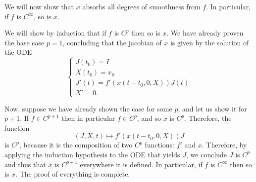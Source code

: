 \documentclass{article}
\begin{document}
We will now show that $x$ absorbs all degrees of smoothness from $f$. In particular, if $f$ is $C^\infty$, so is $x$.

We will show by induction that if $f$ is $C^p$ then so is $x$. We have already proven the base case $p = 1$, concluding that the jacobian of $x$ is given by the solution of the ODE
\[
\begin{cases}
J(t_0) = I\\
X(t_0) = x_0\\
J'(t) = f'(x(t-t_0,0,X)) J(t)\\
X' = 0.
\end{cases}
\]

Now, suppose we have already shown the case for some $p$, and let us show it for $p+1$. If $f \in C^{p+1}$ then in particular $f \in C^p$, and so $x$ is $C^p$. Therefore, the function
\[(J,X,t) \mapsto f'(x(t-t_0,0,X)) J\]
is $C^p$, because it is the composition of two $C^p$ functions: $f'$ and $x$. Therefore, by applying the induction hypothesis to the ODE that yields $J$, we conclude $J$ is $C^p$ and thus that $x$ is $C^{p+1}$ everywhere it is defined. In particular, if $f$ is $C^\infty$ then so is $x$. The proof of everything is complete.
\end{document}
